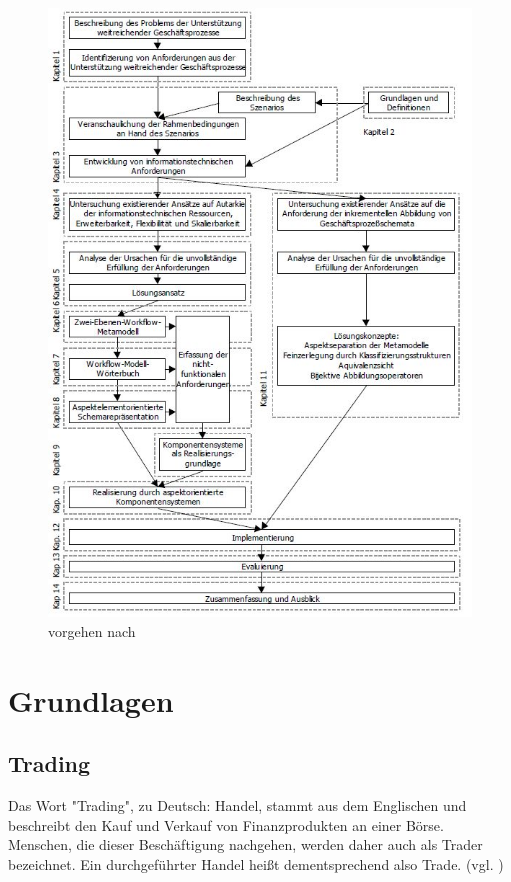 \documentclass[oneside]{ausarbeitung}
\begin{document}
\begin{figure}[htbp]
  \centering
  \includegraphics[height=0.9\textheight]{img/ausarbeitung.jpg}
  \caption{vorgehen nach \autocite{Schmidt:Geschaeftsprozesse}}
  \label{fig:1}
\end{figure}

\chapter{Grundlagen}
\label{cha:grundlagen}

\section{Trading}
\label{sec:trading}

Das Wort "Trading", zu Deutsch: Handel, stammt aus dem Englischen und
beschreibt den Kauf und Verkauf von Finanzprodukten an einer Börse.
Menschen, die dieser Beschäftigung nachgehen, werden daher auch als
Trader bezeichnet. Ein durchgeführter Handel heißt dementsprechend
also Trade. (vgl. \cite{trading_1})
\end{document}

